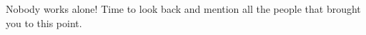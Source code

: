\documentclass[thesis.tex]{subfiles}
\begin{document}
\label{chap:Acknowledgments}

Nobody works alone! Time to look back and mention all the people that brought you to this point.


\newpage
\end{document}
